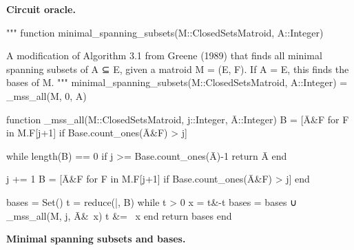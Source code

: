 \textbf{Circuit oracle.} \skelpars[2]

\begin{jllisting}
"""
    function minimal_spanning_subsets(M::ClosedSetsMatroid, A::Integer)

A modification of Algorithm 3.1 from Greene (1989) that finds all minimal spanning subsets of A ⊆ E, given a matroid M = (E, F). If A = E, this finds the bases of M.
"""
minimal_spanning_subsets(M::ClosedSetsMatroid, A::Integer) = _mss_all(M, 0, A)

function _mss_all(M::ClosedSetsMatroid, j::Integer, Ā::Integer)
  B = [Ā&F for F in M.F[j+1] if Base.count_ones(Ā&F) > j]

  while length(B) == 0
    if j >= Base.count_ones(Ā)-1 return Ā end
    
    j += 1
    B = [Ā&F for F in M.F[j+1] if Base.count_ones(Ā&F) > j]
  end

  bases = Set()
  t = reduce(|, B)
  while t > 0
    x = t&-t
    bases = bases ∪ _mss_all(M, j, Ā&~x)
    t &= ~x
  end
  return bases
end
\end{jllisting}
\textbf{Minimal spanning subsets and bases.} \skelpar